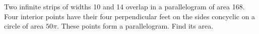 Two infinite strips of widths 10 and 14 overlap in a parallelogram of area 168. Four interior points have their four perpendicular feet on the sides concyclic on a circle of area $50\pi$. These points form a parallelogram. Find its area.
